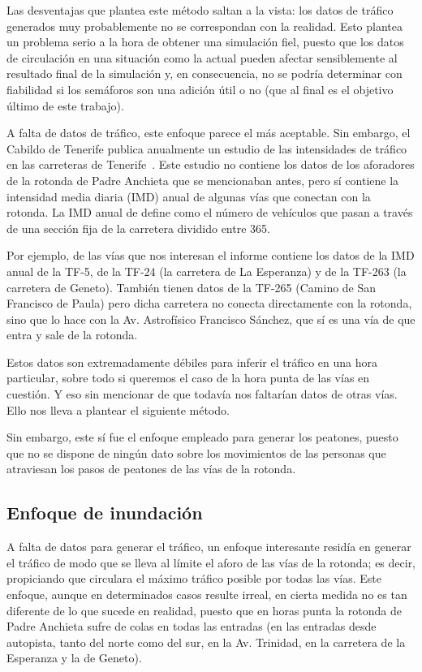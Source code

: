 Las desventajas que plantea este método saltan a la vista: los datos de tráfico generados muy probablemente no se correspondan con la realidad. Esto plantea un problema serio a la hora de obtener una simulación fiel, puesto que los datos de circulación en una situación como la actual pueden afectar sensiblemente al resultado final de la simulación y, en consecuencia, no se podría determinar con fiabilidad si los semáforos son una adición útil o no (que al final es el objetivo último de este trabajo).

A falta de datos de tráfico, este enfoque parece el más aceptable. Sin embargo, el Cabildo de Tenerife publica anualmente un estudio de las intensidades de tráfico en las carreteras de Tenerife~\cite{rodriguez_hernandez_intensidades_2019}. Este estudio no contiene los datos de los aforadores de la rotonda de Padre Anchieta que se mencionaban antes, pero sí contiene la intensidad media diaria (IMD) anual de algunas vías que conectan con la rotonda. La IMD anual de define como el número de vehículos que pasan a través de una sección fija de la carretera dividido entre 365.

Por ejemplo, de las vías que nos interesan el informe contiene los datos de la IMD anual de la TF-5, de la TF-24 (la carretera de La Esperanza) y de la TF-263 (la carretera de Geneto). También tienen datos de la TF-265 (Camino de San Francisco de Paula) pero dicha carretera no conecta directamente con la rotonda, sino que lo hace con la Av. Astrofísico Francisco Sánchez, que sí es una vía de que entra y sale de la rotonda.

Estos datos son extremadamente débiles para inferir el tráfico en una hora particular, sobre todo si queremos el caso de la hora punta de las vías en cuestión. Y eso sin mencionar de que todavía nos faltarían datos de otras vías. Ello nos lleva a plantear el siguiente método.

Sin embargo, este sí fue el enfoque empleado para generar los peatones, puesto que no se dispone de ningún dato sobre los movimientos de las personas que atraviesan los pasos de peatones de las vías de la rotonda.


\subsection{Enfoque de inundación}


A falta de datos para generar el tráfico, un enfoque interesante residía en generar el tráfico de modo que se lleva al límite el aforo de las vías de la rotonda; es decir, propiciando que circulara el máximo tráfico posible por todas las vías. Este enfoque, aunque en determinados casos resulte irreal, en cierta medida no es tan diferente de lo que sucede en realidad, puesto que en horas punta la rotonda de Padre Anchieta sufre de colas en todas las entradas (en las entradas desde autopista, tanto del norte como del sur, en la Av. Trinidad, en la carretera de la Esperanza y la de Geneto).

